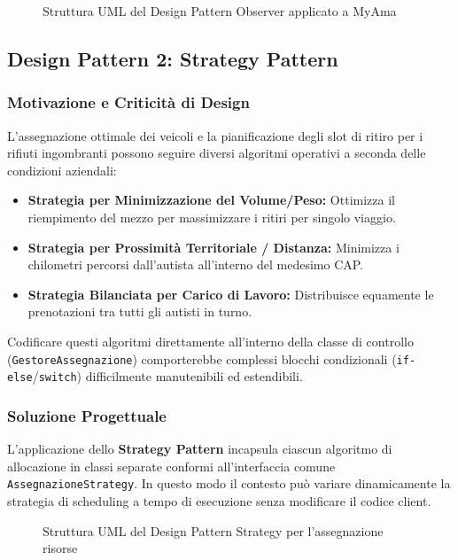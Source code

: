 \begin{figure}[H]
    \centering
    \caption{Struttura UML del Design Pattern Observer applicato a MyAma}
    \label{fig:pattern_observer}
\end{figure}

\subsection{Design Pattern 2: Strategy Pattern}

\subsubsection{Motivazione e Criticità di Design}
L'assegnazione ottimale dei veicoli e la pianificazione degli slot di ritiro per i rifiuti ingombranti possono seguire diversi algoritmi operativi a seconda delle condizioni aziendali:
\begin{itemize}
    \item \textbf{Strategia per Minimizzazione del Volume/Peso:} Ottimizza il riempimento del mezzo per massimizzare i ritiri per singolo viaggio.
    \item \textbf{Strategia per Prossimità Territoriale / Distanza:} Minimizza i chilometri percorsi dall'autista all'interno del medesimo CAP.
    \item \textbf{Strategia Bilanciata per Carico di Lavoro:} Distribuisce equamente le prenotazioni tra tutti gli autisti in turno.
\end{itemize}
Codificare questi algoritmi direttamente all'interno della classe di controllo (\texttt{GestoreAssegnazione}) comporterebbe complessi blocchi condizionali (\texttt{if-else}/\texttt{switch}) difficilmente manutenibili ed estendibili.

\subsubsection{Soluzione Progettuale}
L'applicazione dello \textbf{Strategy Pattern} incapsula ciascun algoritmo di allocazione in classi separate conformi all'interfaccia comune \texttt{AssegnazioneStrategy}. In questo modo il contesto può variare dinamicamente la strategia di scheduling a tempo di esecuzione senza modificare il codice client.

\begin{figure}[H]
    \centering
    \caption{Struttura UML del Design Pattern Strategy per l'assegnazione risorse}
    \label{fig:pattern_strategy}
\end{figure}
